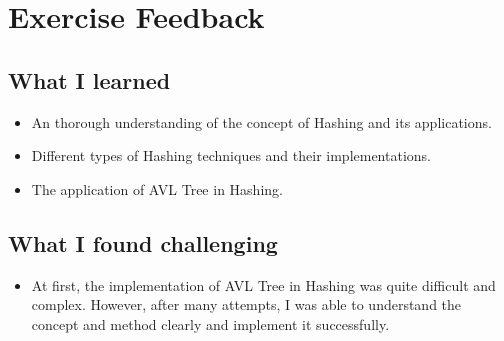 \section{Exercise Feedback}
\subsection*{What I learned}
\begin{itemize}
	\item An thorough understanding of the concept of Hashing and its applications.
	\item Different types of Hashing techniques and their implementations.
	\item The application of AVL Tree in Hashing.
\end{itemize}

\subsection*{What I found challenging}
\begin{itemize}
	\item At first, the implementation of AVL Tree in Hashing was quite difficult and complex. However, after many attempts, I was able to understand the concept and method clearly and implement it successfully.
\end{itemize}